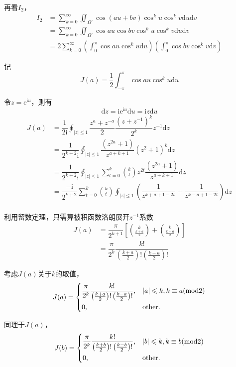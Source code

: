 \documentclass[twocolumn]{article} %
\newcommand{\di}{\mathrm{d}}
\newcommand{\ii}{\mathrm{i}}
\newcommand{\e}[1]{\mathrm{e}^{#1}}
\begin{document}
再看$I_2$，
\begin{align*}
  I_2&=\sum_{k=0}^{\infty}\iint_{\Omega'}\cos(au+bv)\cos^ku\cos^kv\di u\di v\\
  &=\sum_{k=0}^{\infty}\iint_{\Omega'}\cos au\cos bv\cos^ku\cos^kv\di u\di v\\
  &=2\sum_{k=0}^{\infty}\left(\int_0^\pi\cos au\cos^ku\di u\right)\left(\int_0^\pi\cos bv\cos^kv\di v\right)
\end{align*}

记
\begin{equation}
  J(a)=\dfrac{1}{2}\int_{-\pi}^\pi\cos au\cos^ku\di u
\end{equation}

令$z=\e{\ii u}$，则有
\begin{equation}
  \di z=\ii\e{\ii u}\di u=\ii z\di u
\end{equation}
\begin{align*}
  J(a)&=\dfrac{1}{2\ii}\oint_{|z|\leqslant1}\dfrac{z^a+z^{-a}}{2}\dfrac{\left(z+z^{-1}\right)^k}{2^k}z^{-1}\di z\\
  &=\dfrac{1}{2^{k+2}\ii}\oint_{|z|\leqslant1}\dfrac{\left(z^{2a}+1\right)}{z^{a+k+1}}\left(z^2+1\right)^k\di z\\
  &=\dfrac{1}{2^{k+2}\ii}\oint_{|z|\leqslant1}\sum_{t=0}^{k}\binom{k}{t}z^{2t}\dfrac{\left(z^{2a}+1\right)}{z^{a+k+1}}\di z\\
  &=\dfrac{-\ii}{2^{k+2}}\sum_{t=0}^{k}\binom{k}{t}\oint_{|z|\leqslant1}\left(\dfrac{1}{z^{k+a+1-2t}}+\dfrac{1}{z^{k-a+1-2t}}\right)\di z\\
\end{align*}

利用留数定理，只需算被积函数洛朗展开$z^{-1}$系数
\begin{align*}
  J(a)&=\dfrac{\pi}{2^{k+1}}\left[\binom{k}{\frac{k+a}{2}}+\binom{k}{\frac{k-a}{2}}\right]\\
  &=\dfrac{\pi}{2^k}\dfrac{k!}{\left(\frac{k+a}{2}\right)!\left(\frac{k-a}{2}\right)!}
\end{align*}

考虑$J(a)$关于$k$的取值，
\begin{equation}
  J(a)=
  \begin{dcases}
    \dfrac{\pi}{2^k}\dfrac{k!}{\left(\frac{k+a}{2}\right)!\left(\frac{k-a}{2}\right)!},&|a|\leqslant k,k\equiv a(\text{mod}2)\\
    0,&\text{other}.
  \end{dcases}
\end{equation}

同理于$J(a)$，
\begin{equation}
  J(b)=
  \begin{dcases}
    \dfrac{\pi}{2^k}\dfrac{k!}{\left(\frac{k+b}{2}\right)!\left(\frac{k-b}{2}\right)!},&|b|\leqslant k,k\equiv b(\text{mod}2)\\
    0,&\text{other}.
  \end{dcases}
\end{equation}
\end{document}
